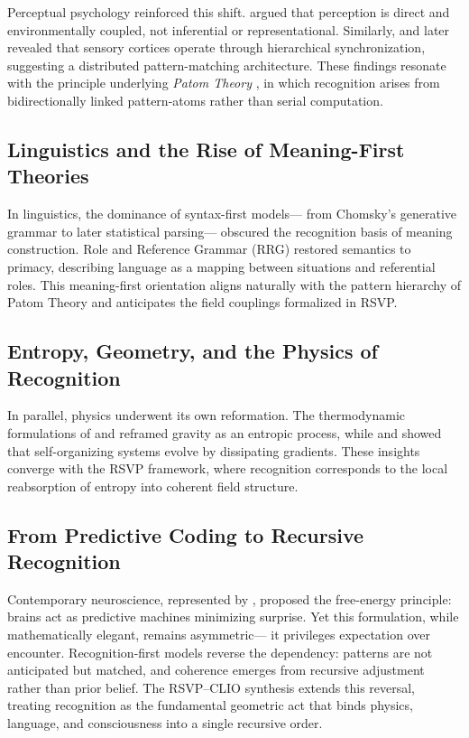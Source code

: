 \documentclass[11pt]{article}
\begin{document}
Perceptual psychology reinforced this shift.
\citet{gibson1979ecological} argued that perception is direct and
environmentally coupled, not inferential or representational.
Similarly, \citet{neisser1967cognitive} and later \citet{buzsaki2019brainrhythms}
revealed that sensory cortices operate through hierarchical synchronization,
suggesting a distributed pattern-matching architecture.
These findings resonate with the principle underlying
\textit{Patom Theory} \citep{ball2020patom}, in which recognition arises
from bidirectionally linked pattern-atoms rather than serial computation.

\subsection{Linguistics and the Rise of Meaning-First Theories}

In linguistics, the dominance of syntax-first models—
from Chomsky’s generative grammar to later statistical parsing—
obscured the recognition basis of meaning construction.
Role and Reference Grammar (RRG) \citep{vanvalin2005rrg} restored
semantics to primacy, describing language as a mapping between
situations and referential roles.
This meaning-first orientation aligns naturally with the pattern hierarchy
of Patom Theory and anticipates the field couplings formalized in RSVP.

\subsection{Entropy, Geometry, and the Physics of Recognition}

In parallel, physics underwent its own reformation.
The thermodynamic formulations of \citet{jacobson1995thermodynamics} and
\citet{verlinde2011entropic} reframed gravity as an entropic process,
while \citet{prigogine1984orderchaos} and \citet{ulanowicz1986growth}
showed that self-organizing systems evolve by dissipating gradients.
These insights converge with the RSVP framework, where recognition
corresponds to the local reabsorption of entropy into coherent field
structure.

\subsection{From Predictive Coding to Recursive Recognition}

Contemporary neuroscience, represented by
\citet{friston2010free}, proposed the free-energy principle:
brains act as predictive machines minimizing surprise.
Yet this formulation, while mathematically elegant, remains asymmetric—
it privileges expectation over encounter.
Recognition-first models reverse the dependency:
patterns are not anticipated but matched,
and coherence emerges from recursive adjustment rather than prior belief.
The RSVP–CLIO synthesis extends this reversal,
treating recognition as the fundamental geometric act that
binds physics, language, and consciousness into a single recursive order.
\end{document}
